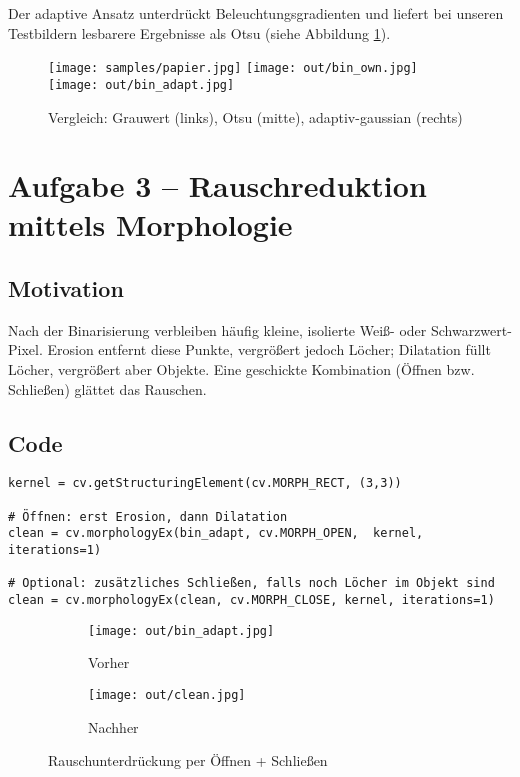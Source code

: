 \documentclass[a4paper,11pt]{article}
\begin{document}
Der adaptive Ansatz unterdrückt Beleuchtungsgradienten
und liefert bei unseren Testbildern lesbarere Ergebnisse
als Otsu (siehe Abbildung \ref{fig:adapt}).

\begin{figure}[H]
  \centering
  \texttt{[image: samples/papier.jpg]}
  \texttt{[image: out/bin\_own.jpg]}
  \texttt{[image: out/bin\_adapt.jpg]}
  \caption{Vergleich: Grauwert (links), Otsu (mitte), adaptiv-gaussian (rechts)}
  \label{fig:adapt}
\end{figure}

\section{Aufgabe 3 – Rauschreduktion mittels Morphologie}
\subsection{Motivation}
Nach der Binarisierung verbleiben häufig kleine, isolierte
Wei{\ss}- oder Schwarzwert-Pixel.  
Erosion entfernt diese Punkte, vergrößert jedoch Löcher;
Dilata­tion füllt Löcher, vergrößert aber Objekte.  
Eine geschickte Kombination (Öffnen bzw. Schließen) glättet das Rauschen.

\subsection{Code}
\begin{lstlisting}[caption={Morphologische Nachverarbeitung}]
kernel = cv.getStructuringElement(cv.MORPH_RECT, (3,3))

# Öffnen: erst Erosion, dann Dilatation
clean = cv.morphologyEx(bin_adapt, cv.MORPH_OPEN,  kernel, iterations=1)

# Optional: zusätzliches Schließen, falls noch Löcher im Objekt sind
clean = cv.morphologyEx(clean, cv.MORPH_CLOSE, kernel, iterations=1)
\end{lstlisting}

\begin{figure}[H]
  \centering
  \begin{subfigure}{.32\linewidth}\centering
    \texttt{[image: out/bin\_adapt.jpg]}
    \caption{Vorher}
  \end{subfigure}
  \hfill
  \begin{subfigure}{.32\linewidth}\centering
    \texttt{[image: out/clean.jpg]}
    \caption{Nachher}
  \end{subfigure}
  \caption{Rauschunterdrückung per Öffnen + Schließen}
\end{figure}
\end{document}
